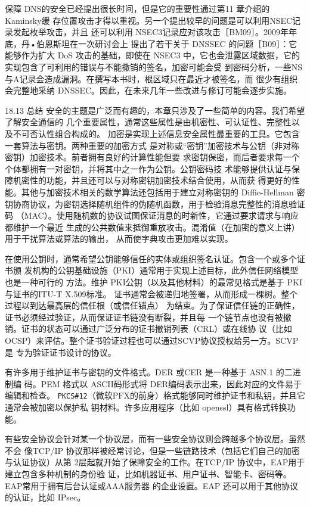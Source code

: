 保障 DNS的安全已经提出很长时间，但是它的重要性通过第11 章介绍的Kaminsky缓
存位置攻击才得以重视。另一个提出较早的问题是可以利用NSEC记录发起枚举攻击，并且
还可以利用 NSEC3记录应对该攻击［BM09］。2009年年底，丹•伯恩斯坦在一次研讨会上
提出了若干关于 DNSSEC 的问题［B09］：它能够作为扩大 DoS 攻击的基础，即使在 NSEC3
中，它也会泄露区域数据，它的实现包含了可利用的错误与不能撒销的签名，加密可能会受
到密码分析，一些NS与A记录会造成漏洞。在撰写本书时，根区域只在最近才被签名，而
很少有组织会完整地采纳 DNSSEC。因此，在未来几年一些改进与修订可能会逐步实施。

18.13 总结
安全的主题是广泛而有趣的，本章只涉及了一些简单的内容。我们希望了解安全通信的
几个重要属性，通常这些属性是由机密性、可认证性、完整性以及不可否认性组合构成的。
加密是实现上述信息安全属性最重要的工具。它包含一套算法与密钥。两种重要的加密方式
是对称或“密钥”加密技术与公钥（非对称密钥）加密技术。前者拥有良好的计算性能但要
求密钥保密，而后者要求每一个个体都拥有一对密钥，并将其中之一作为公钥。公钥密码技
术能够提供认证与保障机密性的功能，并且还可以与对称密钥加密技术结合使用，从而获
得更好的性能。其他与加密技术相关的数学算法还包括用于建立对称密钥的 Diffie-Hellman
密钥协商协议，为密钥选择随机组件的伪随机函数，用于检验消息完整性的消息验证码
（MAC）。使用随机数的协议试图保证消息的时新性，它通过要求请求与响应都维护一个最近
生成的公共数值来抵御重放攻击。混淆值（在加密的意义上讲）用于干扰算法或算法的输出，
从而使字典攻击更加难以实现。

在使用公钥时，通常希望公钥能够信任的实体或组织签名认证。包含一个或多个证书颁
发机构的公钥基础设施（PKI）通常用于实现上述目标，此外信任网络模型也是一种可行的
方法。维护 PKI公钥（以及其他材料）的最常见格式是基于 PKI与证书的ITU-T X.509标准。
证书通常会被递归地签署，从而形成一棵树。整个过程以到达最高层的信任根（或信任锚点）
为结束。为了保证信任链的正确性，证书必须经过验证，从而保证证书链没有断裂，并且每
一个链节点也没有被撤销。证书的状态可以通过广泛分布的证书撤销列表（CRL）或在线协
议（比如 OCSP）来评估。整个证书验证过程也可以通过SCVP协议授权给另一方。SCVP是
专为验证证书设计的协议。

有许多用于维护证书与密钥的文件格式。DER 或CER 是一种基于 ASN.1 的二进制编
码。PEM 格式以 ASCII码形式将 DER编码表示出来，因此对应的文件易于编辑和检查。
\verb|PKCS#12|（微软PFX的前身）格式能够同时维护证书和私钥，并且它通常会被加密以保护私
钥材料。许多应用程序（比如 openssl）具有格式转换功能。

有些安全协议会针对某一个协议层，而有一些安全协议则会跨越多个协议层。虽然不会
像TCP/IP 协议那样被经常讨论，但是一些链路技术（包括它们自己的加密与认证协议）从第
2层起就开始了保障安全的工作。在TCP/IP 协议中，EAP用于建立包含多种机制的身份验
证，比如机器证书、用户证书、智能卡、密码等。EAP常用于拥有后台认证或AAA服务器
的企业设置。EAP 还可以用于其他协议的认证，比如 IPsec。

